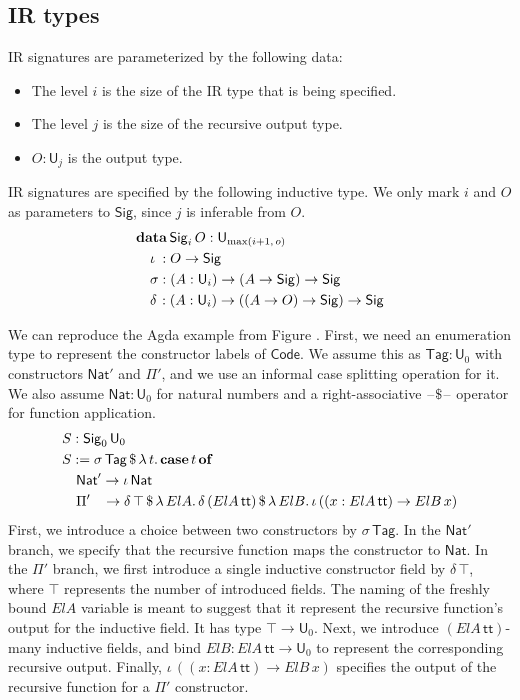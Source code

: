 \documentclass[acmsmall,screen,review,anonymous]{acmart}
\newcommand{\msf}[1]{{\mathsf{#1}}}
\newcommand{\mbf}[1]{{\mathbf{#1}}}
\newcommand{\data}{\mbf{data}}
\newcommand{\U}{\msf{U}}
\newcommand{\Nat}{\msf{Nat}}
\newcommand{\Sig}{\msf{Sig}}
\newcommand{\Code}{\msf{Code}}
\newcommand{\Tag}{\msf{Tag}}
\newcommand{\case}{\mbf{case}}
\newcommand{\of}{\mbf{of}}
\newcommand{\ttt}{\msf{tt}}
\newcommand{\blank}{{\mathord{\hspace{1pt}\text{--}\hspace{1pt}}}}
\begin{document}
\subsection{IR types}
IR signatures are parameterized by the following data:
\begin{itemize}
\item The level $i$ is the size of the IR type that is being specified.
\item The level $j$ is the size of the recursive output type.
\item $O : \U_j$ is the output type.
\end{itemize}
IR signatures are specified by the following inductive type. We only mark $i$ and $O$ as parameters to $\Sig$,
since $j$ is inferable from $O$.
\begin{alignat*}{4}
  &\data\, \Sig_i\,O : \U_{\max(i+1,\,o)}\\
  &\quad \iota\hspace{0.25em}  : O \to \Sig \\
  &\quad \sigma               : (A : \U_i) \to (A \to \Sig) \to \Sig \\
  &\quad \delta\hspace{0.1em} : (A : \U_i) \to ((A \to O) \to \Sig) \to \Sig
\end{alignat*}
\begin{example}
We can reproduce the Agda example from Figure \cite{TODO}. First, we need an enumeration type to
represent the constructor labels of $\Code$. We assume this as $\Tag : \U_0$ with constructors
$\Nat'$ and $\Pi'$, and we use an informal case splitting operation for it. We also assume $\Nat :
\U_0$ for natural numbers and a right-associative $\blank\!\$\!\blank$ operator for function application.
\begin{alignat*}{4}
  & S : \Sig_0\,\U_0\\
  & S := \sigma\,\Tag\,\$\,\lambda\,t.\,\case\,t\,\of \\
  & \quad \Nat' \to \iota\,\Nat \\
  & \quad \Pi'\hspace{0.85em} \to \delta\,\top\,\$\,\lambda\,{ElA}.\, \delta\,({ElA}\,\ttt)\,\$\,\lambda\,{ElB}.\,
      \iota\, ((x : {ElA}\,\ttt) \to {ElB}\,x)
\end{alignat*}
First, we introduce a choice between two constructors by $\sigma\,\Tag$. In the $\Nat'$ branch, we
specify that the recursive function maps the constructor to $\Nat$. In the $\Pi'$ branch, we first
introduce a single inductive constructor field by $\delta\,\top$, where $\top$ represents the number
of introduced fields. The naming of the freshly bound ${ElA}$ variable is meant to suggest that it
represent the recursive function's output for the inductive field. It has type $\top \to \U_0$.
Next, we introduce $({ElA}\,\ttt)$-many inductive fields, and bind ${ElB} : {ElA}\,\ttt \to \U_0$ to
represent the corresponding recursive output. Finally, $\iota\, ((x : {ElA}\,\ttt) \to {ElB}\,x)$
specifies the output of the recursive function for a $\Pi'$ constructor.
\end{example}
\end{document}
